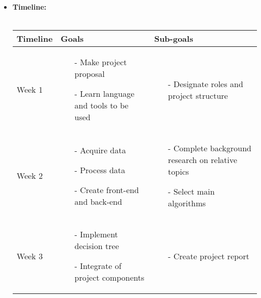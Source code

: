 \documentclass{article}
\begin{document}
\begin{itemize}
    
    \newpage
    \item \textbf{Timeline:}\\ \\
    \begin{table}[H]
        \centering
        \begin{tabularx}{\linewidth}{  |p{}%
        |p{}%
        |p{}|%
          }
        \hline
        \textbf{Timeline} & \textbf{Goals} & \textbf{Sub-goals} \\
        \hline
        Week 1 
        & 
        \begin{itemize}[leftmargin=*]
            \item[-] Make project proposal 
            \item[-] Learn language and tools to be used  
        \end{itemize} 
        & 
        \begin{itemize}[leftmargin=*] 
            \item[-]Designate roles and project structure
        \end{itemize}    
        \\
        \hline
        Week 2 
        & 
        \begin{itemize}[leftmargin=*] 
            \item[-] Acquire data
            \item[-] Process data
            \item[-] Create front-end and back-end
        \end{itemize} 
        & 
        \begin{itemize}[leftmargin=*] 
            \item[-] Complete background research on relative topics
            \item[-] Select main algorithms
        \end{itemize}        
        \\
        
        \hline
        Week 3 
        & 
        \begin{itemize}[leftmargin=*] 
            \item[-] Implement decision tree
            \item[-] Integrate of project components
        \end{itemize}
        & 
        \begin{itemize}[leftmargin=*] 
        \item[-] Create project report
        \end{itemize}
        \\
        

\end{tabularx}
\end{table}
\end{itemize}
\end{document}
